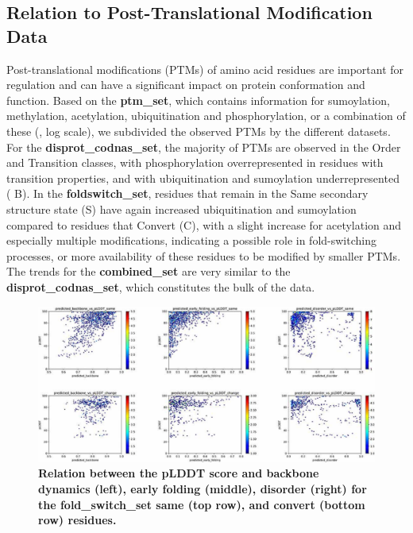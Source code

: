 \subsection{Relation to Post-Translational Modification Data}

Post-translational modifications (PTMs) of amino acid residues are important for regulation and can have a significant impact on protein conformation and function. Based on the \textbf{ptm_set}, which contains information for sumoylation, methylation, acetylation, ubiquitination and phosphorylation, or a combination of these (, log scale), we subdivided the observed PTMs by the different datasets. For the \textbf{disprot_codnas_set}, the majority of PTMs are observed in the Order and Transition classes, with phosphorylation overrepresented in residues with transition properties, and with ubiquitination and sumoylation underrepresented ( B). In the \textbf{foldswitch_set}, residues that remain in the Same secondary structure state (S) have again increased ubiquitination and sumoylation compared to residues that Convert (C), with a slight increase for acetylation and especially multiple modifications, indicating a possible role in fold-switching processes, or more availability of these residues to be modified by smaller PTMs. The trends for the \textbf{combined_set} are very similar to the \textbf{disprot_codnas_set}, which constitutes the bulk of the data.

\begin{figure}[tbh]
    \centering
    \includegraphics[width=\linewidth]{ambiguous//figures_ambiguous/fig7.pdf}
    \caption{\textbf{Relation between the pLDDT score and backbone dynamics (left), early folding (middle), disorder (right) for the fold_switch_set same (top row), and convert (bottom row) residues.}}
    \label{fig:chapter5:fig7}
\end{figure}

